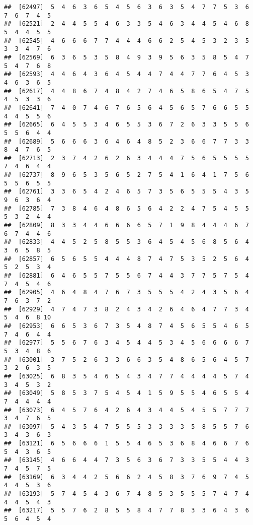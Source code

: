 \documentclass[
]{book}
\begin{document}
\begin{verbatim}
##  [62497]  5  4  6  3  6  5  4  5  6  3  6  3  5  4  7  7  5  3  6  7  6  7  4  5
##  [62521]  2  4  4  5  5  4  6  3  3  5  4  6  3  4  4  5  4  6  8  5  4  4  5  5
##  [62545]  4  6  6  6  7  7  4  4  4  6  6  2  5  4  5  3  2  3  5  3  3  4  7  6
##  [62569]  6  3  6  5  3  5  8  4  9  3  9  5  6  3  5  8  5  4  7  5  4  7  6  8
##  [62593]  4  4  6  4  3  6  4  5  4  4  7  4  4  7  7  6  4  5  3  4  6  3  6  5
##  [62617]  4  4  8  6  7  4  8  4  2  7  4  6  5  8  6  5  4  7  5  4  5  3  3  6
##  [62641]  7  4  0  7  4  6  7  6  5  6  4  5  6  5  7  6  6  5  5  4  4  5  5  6
##  [62665]  6  4  5  5  3  4  6  5  5  3  6  7  2  6  3  3  5  5  6  5  5  6  4  4
##  [62689]  5  6  6  6  3  6  4  6  4  8  5  2  3  6  6  7  7  3  3  8  4  7  6  5
##  [62713]  2  3  7  4  2  6  2  6  3  4  4  4  7  5  6  5  5  5  5  7  4  6  4  4
##  [62737]  8  9  6  5  3  5  6  5  2  7  5  4  1  6  4  1  7  5  6  5  5  6  5  5
##  [62761]  3  3  6  5  4  2  4  6  5  7  3  5  6  5  5  5  4  3  5  9  6  3  6  4
##  [62785]  7  3  8  4  6  4  8  6  5  6  4  2  2  4  7  5  4  5  5  5  3  2  4  4
##  [62809]  8  3  3  4  4  6  6  6  6  5  7  1  9  8  4  4  4  6  7  6  7  4  4  6
##  [62833]  4  4  5  2  5  8  5  5  3  6  4  5  4  5  6  8  5  6  4  3  6  5  8  5
##  [62857]  6  5  6  5  5  4  4  4  8  7  4  7  5  3  5  2  5  6  4  5  2  5  3  4
##  [62881]  6  4  6  5  5  7  5  5  6  7  4  4  3  7  7  5  7  5  4  7  4  5  4  6
##  [62905]  4  6  4  8  4  7  6  7  3  5  5  5  4  2  4  3  5  6  4  7  6  3  7  2
##  [62929]  4  7  4  7  3  8  2  4  3  4  2  6  4  6  4  7  7  3  4  5  4  6  8 10
##  [62953]  6  6  5  3  6  7  3  5  4  8  7  4  5  6  5  5  4  6  5  7  4  6  4  4
##  [62977]  5  5  6  7  6  3  4  5  4  4  5  3  4  5  6  6  6  6  7  5  3  4  8  6
##  [63001]  3  7  5  2  6  3  3  6  6  3  5  4  8  6  5  6  4  5  7  3  2  6  3  5
##  [63025]  6  8  3  5  4  6  5  4  3  4  7  7  4  4  4  4  5  7  4  3  4  5  3  2
##  [63049]  5  8  5  3  7  5  4  5  4  1  5  9  5  5  4  6  5  5  4  7  4  4  4  4
##  [63073]  6  4  5  7  6  4  2  6  4  3  4  4  5  4  5  5  7  7  7  3  4  7  6  5
##  [63097]  5  4  3  5  4  7  5  5  5  3  3  3  3  5  8  5  5  7  6  3  4  3  6  3
##  [63121]  6  5  6  6  6  1  5  5  4  6  5  3  6  8  4  6  6  7  6  5  4  3  6  5
##  [63145]  4  6  6  4  4  7  3  5  6  3  6  7  3  3  5  5  4  4  3  7  4  5  7  5
##  [63169]  6  3  4  4  2  5  6  6  2  4  5  8  3  7  6  9  7  4  5  4  4  5  3  6
##  [63193]  5  7  4  5  4  3  6  7  4  8  5  3  5  5  5  7  4  7  4  4  4  5  4  3
##  [63217]  5  5  7  6  2  8  5  5  8  4  7  7  8  3  3  6  4  3  6  5  6  4  5  4

\end{verbatim}
\end{document}
